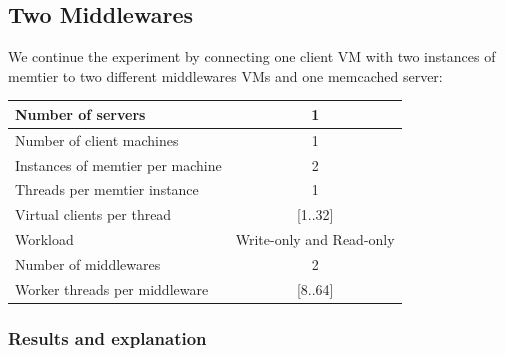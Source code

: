 \documentclass[11pt,a4paper]{article}
\begin{document}
\subsection{Two Middlewares}

We continue the experiment by connecting one client VM with two instances of memtier to two different middlewares VMs and one memcached server:

\begin{center}
	\scriptsize{
		\begin{tabular}{|l|c|}
			\hline Number of servers                & 1                        \\ 
			\hline Number of client machines        & 1                        \\ 
			\hline Instances of memtier per machine & 2                        \\ 
			\hline Threads per memtier instance     & 1                        \\
			\hline Virtual clients per thread       & [1..32]                  \\ 
			\hline Workload                         & Write-only and Read-only \\
			\hline Number of middlewares            & 2                        \\
			\hline Worker threads per middleware    & [8..64]                  \\
			\hline 
		\end{tabular}
	} 
\end{center}
\subsubsection{Results and explanation}
\end{document}
